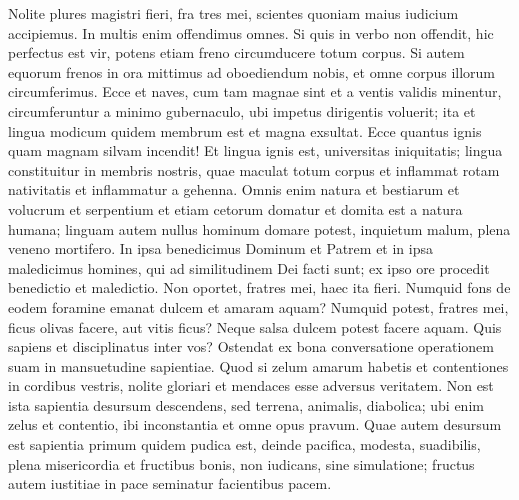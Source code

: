 \begin{biblechapter} 
\verse Nolite plures magistri fieri, fra tres mei, scientes quoniam maius iudicium accipiemus. 
\verse In multis enim offendimus omnes. Si quis in verbo non offendit, hic perfectus est vir, potens etiam freno circumducere totum corpus. 
\verse Si autem equorum frenos in ora mittimus ad oboediendum nobis, et omne corpus illorum circumferimus. 
\verse Ecce et naves, cum tam magnae sint et a ventis validis minentur, circumferuntur a minimo gubernaculo, ubi impetus dirigentis voluerit; 
\verse ita et lingua modicum quidem membrum est et magna exsultat. Ecce quantus ignis quam magnam silvam incendit! 
\verse Et lingua ignis est, universitas iniquitatis; lingua constituitur in membris nostris, quae maculat totum corpus et inflammat rotam nativitatis et inflammatur a gehenna. 
\verse Omnis enim natura et bestiarum et volucrum et serpentium et etiam cetorum domatur et domita est a natura humana; 
\verse linguam autem nullus hominum domare potest, inquietum malum, plena veneno mortifero. 
\verse In ipsa benedicimus Dominum et Patrem et in ipsa maledicimus homines, qui ad similitudinem Dei facti sunt; 
\verse ex ipso ore procedit benedictio et maledictio. Non oportet, fratres mei, haec ita fieri.  
\verse Numquid fons de eodem foramine emanat dulcem et amaram aquam? 
\verse Numquid potest, fratres mei, ficus olivas facere, aut vitis ficus? Neque salsa dulcem potest facere aquam. 
\verse Quis sapiens et disciplinatus inter vos? Ostendat ex bona conversatione operationem suam in mansuetudine sapientiae. 
\verse Quod si zelum amarum habetis et contentiones in cordibus vestris, nolite gloriari et mendaces esse adversus veritatem. 
\verse Non est ista sapientia desursum descendens, sed terrena, animalis, diabolica; 
\verse ubi enim zelus et contentio, ibi inconstantia et omne opus pravum. 
\verse Quae autem desursum est sapientia primum quidem pudica est, deinde pacifica, modesta, suadibilis, plena misericordia et fructibus bonis, non iudicans, sine simulatione; 
\verse fructus autem iustitiae in pace seminatur facientibus pacem. 
\end{biblechapter}

